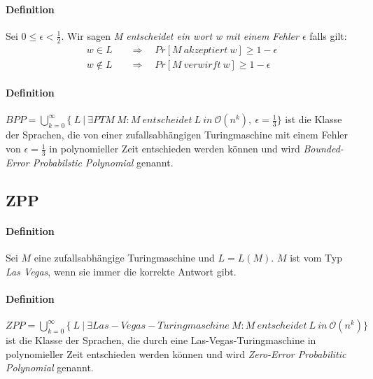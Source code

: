 \paragraph{Definition}
Sei $0 \leq \epsilon < \frac{1}{2}$. Wir sagen \emph{M entscheidet ein wort w mit einem Fehler $\epsilon$} falls gilt:
\begin{align*}
	w \in L \quad & \Rightarrow \quad Pr[M\ akzeptiert\ w] \geq 1 - \epsilon \\
	w \notin L \quad & \Rightarrow \quad Pr[M\ verwirft\ w] \geq 1 - \epsilon
\end{align*}

\paragraph{Definition}
$BPP = \bigcup\limits_{k=0}^{\infty} \bigl\{\ L\ \bigl\lvert\ \exists PTM\ M : M\ entscheidet\ L\ in\ \mathcal{O}(n^k),\ \epsilon =  \frac{1}{3} \bigl\}$ ist die Klasse der Sprachen, die von einer zufallsabhängigen Turingmaschine mit einem Fehler von $\epsilon = \frac{1}{3}$ in polynomieller Zeit entschieden werden können und wird \emph{Bounded-Error Probabilstic Polynomial} genannt.


\subsection{ZPP}
\paragraph{Definition}
Sei $M$ eine zufallsabhängige Turingmaschine und $L = L(M)$. $M$ ist vom Typ \emph{Las Vegas}, wenn sie immer die korrekte Antwort gibt.

\paragraph{Definition}
$ZPP = \bigcup\limits_{k=0}^{\infty} \bigl\{\ L\ \bigl\lvert\ \exists Las-Vegas-Turingmaschine\ M : M\ entscheidet\ L\ in\ \mathcal{O}(n^k) \bigl\}$ ist die Klasse der Sprachen, die durch eine Las-Vegas-Turingmaschine in polynomieller Zeit entschieden werden können und wird \emph{Zero-Error Probabilitic Polynomial} genannt.





